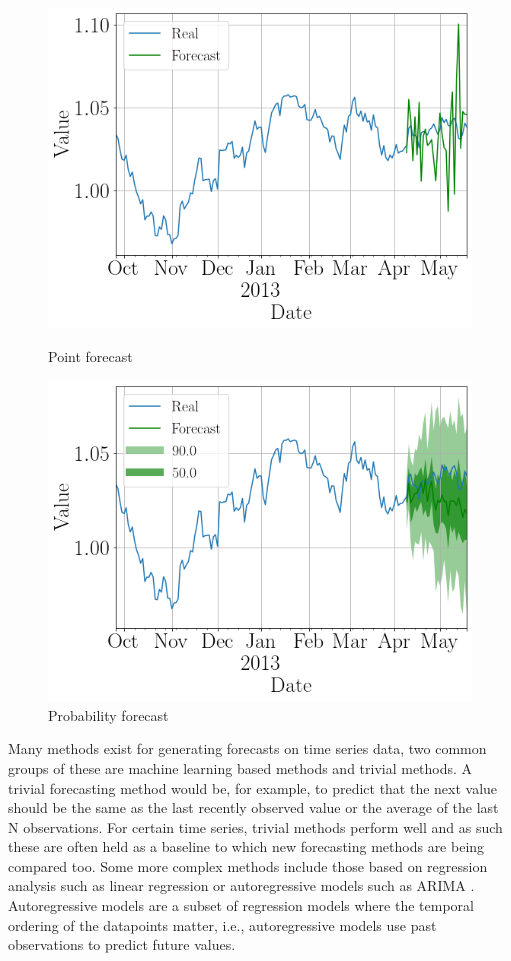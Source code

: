 \begin{figure}[htb]
  \centering
  \includegraphics[width=\linewidth]{./img/exchange_rate_point_forcast.png}
  \caption{Point forecast}
  \label{fig:example_timeseries_forecast_point}
  \endminipage\hfill
  \includegraphics[width=\linewidth]{./img/exchange_rate_prob_forcast.png}
  \caption{Probability forecast}
  \label{fig:example_timeseries_forecast_probabilistic}
  \endminipage\hfill
\end{figure}

Many methods exist for generating forecasts on time series data, two common groups of these are machine learning based methods and trivial methods. A trivial forecasting method would be, for example, to predict that the next value should be the same as the last recently observed value or the average of the last N observations. For certain time series, trivial methods perform well and as such these are often held as a baseline to which new forecasting methods are being compared too. Some more complex methods include those based on regression analysis such as linear regression or autoregressive models such as ARIMA \cite{arima}. Autoregressive models are a subset of regression models where the temporal ordering of the datapoints matter, i.e., autoregressive models use past observations to predict future values.

